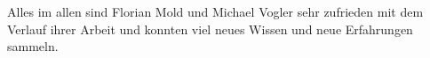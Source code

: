 \documentclass[
fontsize=12pt,
twoside=false,
a4paper,
bibliography=totoc, 		%
listof=totoc,				%
toc=bibliographynumbered, 	%
listof=numbered,			%
]{scrreprt}
\begin{document}
Alles im allen sind Florian Mold und Michael Vogler sehr zufrieden mit dem Verlauf ihrer Arbeit und konnten viel neues Wissen und neue Erfahrungen sammeln.

\renewcommand\thechapter{\Roman{chapter}} 
\setcounter{chapter}{0} 


\begin{appendix}





\end{appendix} 
\end{document}
